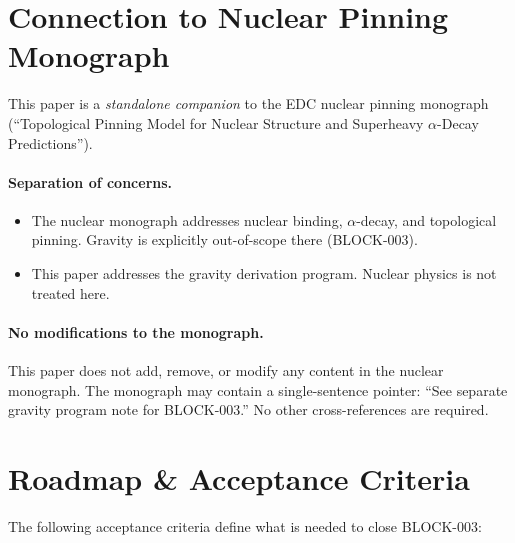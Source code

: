 \documentclass[11pt,a4paper]{article}
\begin{document}
\section{Connection to Nuclear Pinning Monograph}
\label{sec:connection}

This paper is a \emph{standalone companion} to the EDC nuclear pinning monograph (``Topological Pinning Model for Nuclear Structure and Superheavy $\alpha$-Decay Predictions'').

\paragraph{Separation of concerns.}
\begin{itemize}[nosep]
    \item The nuclear monograph addresses nuclear binding, $\alpha$-decay, and topological pinning. Gravity is explicitly out-of-scope there (BLOCK-003).
    \item This paper addresses the gravity derivation program. Nuclear physics is not treated here.
\end{itemize}

\paragraph{No modifications to the monograph.}
This paper does not add, remove, or modify any content in the nuclear monograph.
The monograph may contain a single-sentence pointer: ``See separate gravity program note for BLOCK-003.''
No other cross-references are required.

\section{Roadmap \& Acceptance Criteria}
\label{sec:roadmap}

The following acceptance criteria define what is needed to close BLOCK-003:
\end{document}
